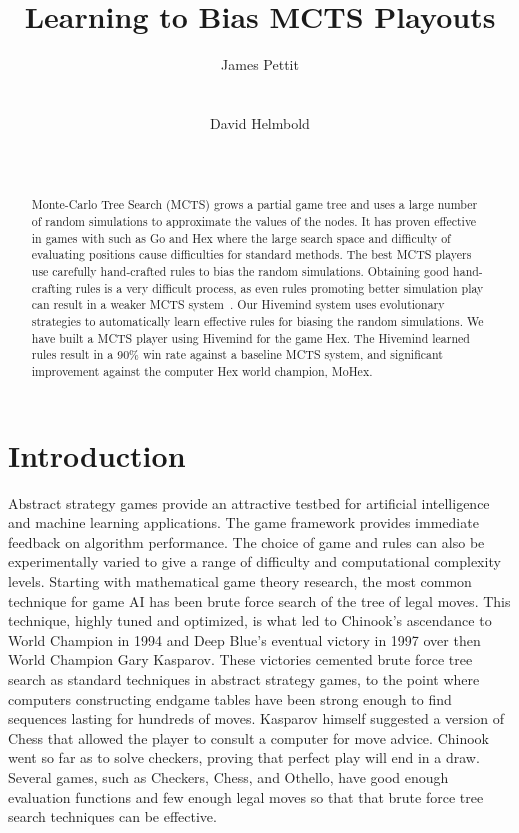 \documentclass{acm_proc_article-sp}
\title{Learning to Bias MCTS Playouts}
\author{ 
%
%
\alignauthor
James Pettit \\
       \affaddr{U.C. Santa Cruz}\\
       \affaddr{Santa Cruz, California}\\
       \email{ james.l.pettit@gmail.com }
\alignauthor
David Helmbold \\
       \affaddr{U.C. Santa Cruz}\\
       \affaddr{Santa Cruz, California}\\
       \email{dph@soe.ucsc.edu}
}
\begin{document}
\maketitle

\begin{abstract}
Monte-Carlo Tree Search (MCTS) 
grows a partial game tree and uses a large number of random simulations to
approximate the values of the nodes.   
It has proven effective in games with such as Go and Hex where the large search space and
difficulty of evaluating positions cause difficulties for standard methods.
The best MCTS players use carefully hand-crafted rules to bias the random simulations.
Obtaining good  hand-crafting rules is a very difficult process, as even rules promoting better
simulation play can result in a weaker MCTS system~\cite{gelly2006modification}.
Our Hivemind system uses evolutionary strategies to automatically learn effective rules for biasing the 
random simulations.
We have built a MCTS player using Hivemind for the game Hex. 
The Hivemind learned rules result in a 90\% win rate against a baseline MCTS system, and 
significant improvement against the computer Hex world champion, MoHex.
\end{abstract}

\section{Introduction}
Abstract strategy games provide an attractive testbed for artificial intelligence and machine learning applications. The game framework provides immediate feedback on algorithm performance. The choice of game and rules can also be experimentally varied to give a range of difficulty and computational complexity levels. Starting with mathematical game theory research, the most common technique for game AI has been brute force search of the tree of legal moves. This technique, highly tuned and optimized, is what led to Chinook's ascendance to World Champion in 1994 and Deep Blue's eventual victory in 1997 over then World Champion Gary Kasparov. These victories cemented brute force tree search as standard techniques in abstract strategy games, to the point where computers constructing endgame tables have been strong enough to find sequences lasting for hundreds of moves. Kasparov himself suggested a version of Chess that allowed the player to consult a computer for move advice. Chinook went so far as to solve checkers, proving that perfect play will end in a draw. 
Several games, such as  Checkers, Chess, and Othello, have good enough evaluation functions and few enough legal moves so that that brute force tree search techniques can be effective.
\end{document}
